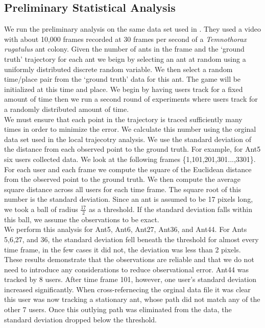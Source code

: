 \documentclass[12pt]{article}
\begin{document}
\subsection{Preliminary Statistical Analysis}
We run the preliminary analysis on the same data set used in \cite{Joy12}. They used a video with about 10,000 frames recorded at 30 frames per second of a {\it Temnothorax rugatulus} ant colony. 
Given the number of ants in the frame and the `ground truth' trajectory for each ant we beign by selecting an ant at random using a uniformly distributed discrete random variable. We then select a random time/place pair from the `ground truth' data for this ant. The game will be initialized at this time and place. We begin by having users track for a fixed amount of time then we run a second round of experiments where users track for a randomly distributed amount of time. \\
\indent We must ensure that each point in the trajectory is traced sufficiently many times in order to minimize the error. We calculate this number using the orginal data set used in the local trajecotry analysis. We use the standard deviation of  the distance from each observed point to the ground truth.
 For example, for Ant5 six users collected data. We look at the following frames \{1,101,201,301...,3301\}. For each user and each frame we compute the square of the Euclidean distance from the observed point to the ground truth. We then compute the average square distance across all users for each time frame. The square root of this number is the standard deviation. Since an ant is assumed to be 17 pixels long, we took a ball of radius $\frac{17}{2}$ as a threshold. If the standard deviation falls within this ball, we assume the observations to be exact. \\
\indent We perform this analysis for Ant5, Ant6, Ant27, Ant36, and Ant44. For Ants 5,6,27, and 36, the standard deviation fell beneath the threshold for almost every time frame, in the few cases it did not, the deviation was less than 2 pixels. These results demonstrate that the observations are reliable and that we do not need to introduce any considerations to reduce observational error. Ant44 was tracked by 8 users. After time frame 101, however, one user's standard deviation increased significantly. When cross-refernecing the orginal data file it was clear this user was now tracking a stationary ant, whose path did not match any of the other 7 users. Once this outlying path was eliminated from the data, the standard deviation dropped below the threshold. \\
\end{document}
